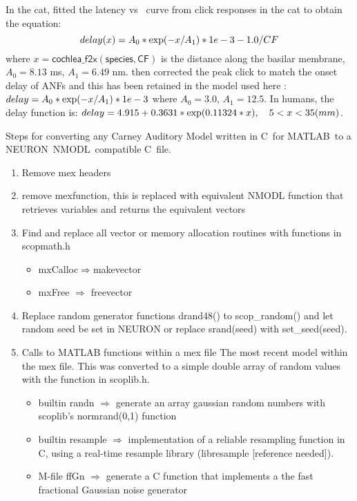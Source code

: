 In the cat, \citet{CarneyYin:1988} fitted the latency vs \CF~curve
from click responses in the cat to obtain the equation:
\begin{equation}
  \label{eq:delay}
   delay (x) = A_0 * {\rm exp}(-x / A_1 ) * 1e-3 - 1.0/CF
\end{equation}
\noindent where $x = \mathsf{cochlea\_f2x(species, CF)}$ is the
distance along the basilar membrane, $A_0 = 8.13$ ms, $A_1 = 6.49$ nm.
\citet{HeinzZhangEtAl:2001} then corrected the peak click to match the
onset delay of ANFs and this has been retained in the model used here
\citep{ZilanyBruceEtAl:2009}: \(delay = A_0 * {\rm exp}(-x / A_1) *
1e-3 \) where $A_0 = 3.0$, $A_1 = 12.5$. In humans, the delay function
is: \( delay = 4.915 + 0.3631 * {\rm exp}(0.11324*x),\quad 5<x<35 (mm)
\).


Steps for converting any Carney Auditory Model written in C~for MATLAB~to a NEURON~NMODL~compatible C~file.
\begin{enumerate}
\item Remove mex headers
\item remove \textsf{mexfunction}, this is replaced with equivalent NMODL function that retrieves variables and returns the equivalent vectors
\item Find and replace all vector or memory allocation routines with functions in scopmath.h
  \begin{itemize}
  \item \textsf{mxCalloc}$\Rightarrow$\textsf{makevector}
  \item \textsf{mxFree} $\Rightarrow$ \textsf{freevector}
  \end{itemize}
\item Replace random generator functions \textsf{drand48()} to \mbox{\textsf{scop\_random()}} and let random seed be set in NEURON or replace \textsf{srand(seed)} with \mbox{\textsf{set\_seed(seed)}}.
\item Calls to MATLAB functions within a mex file The most recent model within the mex file.  This was converted to a simple double array of random values with the  function in \mbox{\textsf{scoplib.h}}.
  \begin{itemize}
  \item builtin \textsf{randn} $\Rightarrow$ generate an array gaussian random numbers with scoplib's \mbox{\textsf{normrand(0,1)}} function
  \item builtin \textsf{resample} $\Rightarrow$ implementation of a reliable resampling function in C, using a real-time resample library (libresample [reference needed]).
  \item M-file \textsf{ffGn} $\Rightarrow$ generate a C function that implements a the fast fractional Gaussian noise generator
  \end{itemize}
\end{enumerate}


